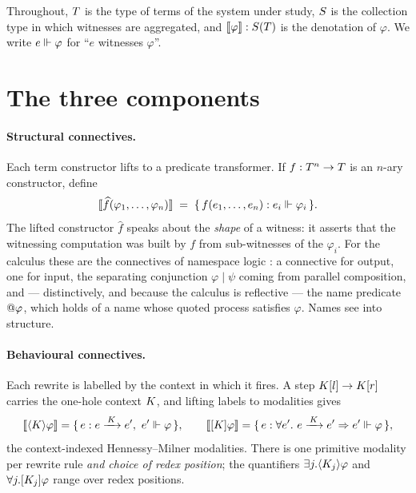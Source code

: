 \begin{notation}
Throughout, $T$ is the type of terms of the system under study, $S$ is the
collection type in which witnesses are aggregated, and $\llbracket \varphi \rrbracket : S(T)$
is the denotation of $\varphi$. We write $e \Vdash \varphi$ for ``$e$ witnesses
$\varphi$''.
\end{notation}

\section{The three components}
\label{sec:three}

\paragraph{Structural connectives.} Each term constructor lifts to a predicate
transformer. If $f : T^{n} \to T$ is an $n$-ary constructor, define
\[
  \llbracket \widehat{f}(\varphi_{1},\dots,\varphi_{n}) \rrbracket
  \;=\;
  \{\, f(e_{1},\dots,e_{n}) : e_{i} \Vdash \varphi_{i} \,\}.
\]
The lifted constructor $\widehat{f}$ speaks about the \emph{shape} of a witness:
it asserts that the witnessing computation was built by $f$ from sub-witnesses of
the $\varphi_{i}$. For the \rhoc{} calculus these are the connectives of namespace
logic \cite{MeredithRadestock05a,MeredithRadestock05b}: a connective for output,
one for input, the separating conjunction $\varphi \mid \psi$ coming from parallel
composition, and --- distinctively, and because the calculus is reflective --- the
name predicate $@\varphi$, which holds of a name whose quoted process
satisfies $\varphi$. Names see into structure.

\paragraph{Behavioural connectives.} Each rewrite is labelled by the context in
which it fires. A step $K[l] \to K[r]$ carries the one-hole context $K$,
and lifting labels to modalities gives
\[
  \llbracket \langle K\rangle \varphi \rrbracket
  = \{\, e : e \xrightarrow{\,K\,} e',\ e' \Vdash \varphi \,\},
  \qquad
  \llbracket [K]\varphi \rrbracket
  = \{\, e : \forall e'.\ e \xrightarrow{\,K\,} e' \Rightarrow e' \Vdash \varphi \,\},
\]
the context-indexed Hennessy--Milner modalities. There is one primitive modality
per rewrite rule \emph{and choice of redex position}; the quantifiers
$\exists j.\langle K_{j}\rangle \varphi$ and $\forall j.[K_{j}]\varphi$
range over redex positions.

